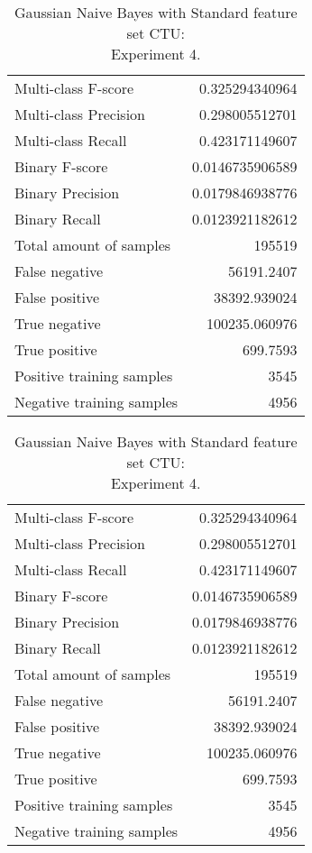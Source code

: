 \begin{table}[H]
\begin{minipage}{0.5\textwidth}
\caption{Gaussian Naive Bayes with Standard feature set CTU: \\Experiment 3.}
\centering
\begin{tabular}{l r}
\toprule
Multi-class F-score & 0.325294340964 \\
Multi-class Precision & 0.298005512701 \\
Multi-class Recall & 0.423171149607 \\
\midrule
Binary F-score & 0.0146735906589 \\
Binary Precision & 0.0179846938776 \\
Binary Recall & 0.0123921182612 \\
\midrule
Total amount of samples & 195519 \\
False negative & 56191.2407 \\
False positive & 38392.939024 \\
True negative & 100235.060976 \\
True positive & 699.7593 \\
\midrule
Positive training samples & 3545 \\
Negative training samples & 4956 \\
\bottomrule
\end{tabular}
\end{minipage}
\hfillx
\begin{minipage}{0.5\textwidth}
\caption{Gaussian Naive Bayes with Standard feature set CTU: \\Experiment 4.}
\centering
\begin{tabular}{l r}
\toprule
Multi-class F-score & 0.325294340964 \\
Multi-class Precision & 0.298005512701 \\
Multi-class Recall & 0.423171149607 \\
\midrule
Binary F-score & 0.0146735906589 \\
Binary Precision & 0.0179846938776 \\
Binary Recall & 0.0123921182612 \\
\midrule
Total amount of samples & 195519 \\
False negative & 56191.2407 \\
False positive & 38392.939024 \\
True negative & 100235.060976 \\
True positive & 699.7593 \\
\midrule
Positive training samples & 3545 \\
Negative training samples & 4956 \\
\bottomrule
\end{tabular}
\end{minipage}
\end{table}
